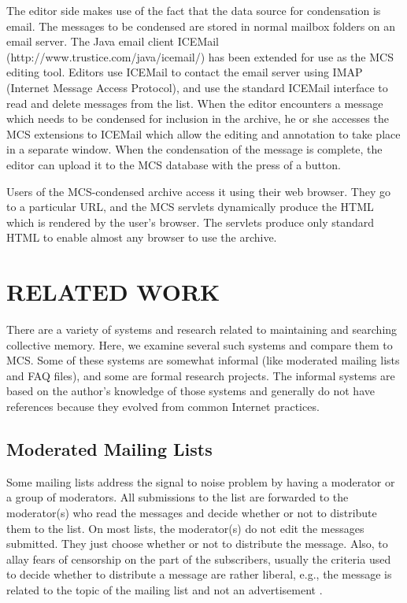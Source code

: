 The editor side makes use of the fact that the data source for condensation is
email. The messages to be condensed are stored in normal mailbox folders on an
email server. The Java email client ICEMail
(http://www.trustice.com/\linebreak[0]java/icemail/) has been extended for use
as the MCS editing tool. Editors use ICEMail to contact the email server using
IMAP (Internet Message Access Protocol), and use the standard ICEMail interface
to read and delete messages from the list. When the editor encounters a message
which needs to be condensed for inclusion in the archive, he or she accesses
the MCS extensions to ICEMail which allow the editing and annotation to take
place in a separate window. When the condensation of the message is complete,
the editor can upload it to the MCS database with the press of a button.

Users of the MCS-condensed archive access it using their web browser. They
go to a particular URL, and the MCS servlets dynamically produce the HTML which
is rendered by the user's browser. The servlets produce only standard HTML to
enable almost any browser to use the archive.

\section{RELATED WORK}
There are a variety of systems and research related to maintaining and
searching collective memory. Here, we examine several such systems and compare
them to MCS. Some of these systems are somewhat informal (like moderated
mailing lists and FAQ files), and some are formal research projects. The
informal systems are based on the author's knowledge of those systems and
generally do not have references because they evolved from common Internet
practices.

\subsection{Moderated Mailing Lists}
Some mailing lists address the signal to noise problem by having a moderator or
a group of moderators. All submissions to the list are forwarded to the
moderator(s) who read the messages and decide whether or not to distribute them
to the list. On most lists, the moderator(s) do not edit the messages
submitted. They just choose whether or not to distribute the message. Also, to
allay fears of censorship on the part of the subscribers, usually the criteria
used to decide whether to distribute a message are rather liberal, e.g., the
message is related to the topic of the mailing list and not an advertisement
\cite{pedersen2-96}.

